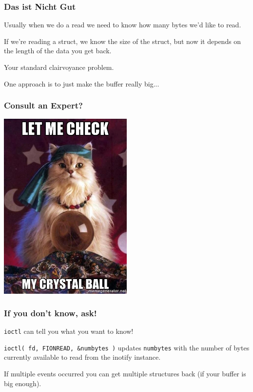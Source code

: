 \begin{frame}
\frametitle{Das ist Nicht Gut}

Usually when we do a read we need to know how many bytes we'd like to read. 

If we're reading a struct, we know the size of the struct, but now it depends on the length of the data you get back. 

Your standard clairvoyance problem. 

One approach is to just make the buffer really big...

\end{frame}


\begin{frame}
\frametitle{Consult an Expert?}

\begin{center}
	\includegraphics[width=0.5\textwidth]{images/clairvoyance.jpg}
\end{center}

\end{frame}



\begin{frame}
\frametitle{If you don't know, ask!}

\texttt{ioctl} can tell you what you want to know! 

\texttt{ioctl( fd, FIONREAD, \&numbytes )} updates \texttt{numbytes} with the number of bytes currently available to read from the inotify instance.  

If multiple events occurred you can get multiple structures back (if your buffer is big enough).


\end{frame}

